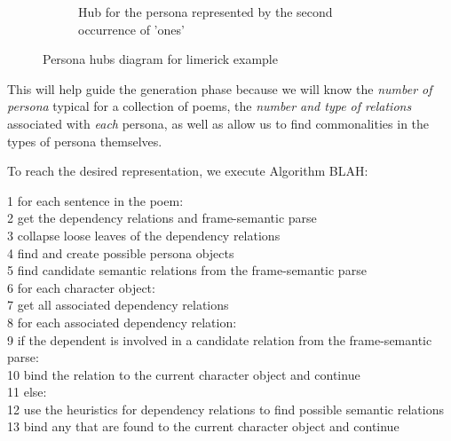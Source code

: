 \begin{figure*}[t!]
\begin{subfigure}[t]{0.45\textwidth}
            \caption{Hub for the persona represented by the second occurrence of 'ones'}
        \end{subfigure}
    \caption{Persona hubs diagram for limerick example}
    \label{fig:limerick-hubs}
\end{figure*}

This will help guide the generation phase because we will know the \textit{number of persona} typical for a collection of poems, the \textit{number and type of relations} associated with \textit{each} persona, as well as allow us to find commonalities in the types of persona themselves.

To reach the desired representation, we execute Algorithm BLAH:

1 for each sentence in the poem:\\
2   get the dependency relations and frame-semantic parse\\
3	collapse loose leaves of the dependency relations\\
4	find and create possible persona objects\\
5	find candidate semantic relations from the frame-semantic parse\\
6	for each character object:\\
7		get all associated dependency relations\\
8		for each associated dependency relation:\\
9			if the dependent is involved in a candidate relation from the frame-semantic parse:\\
10				bind the relation to the current character object and continue\\
11			else:\\
12				use the heuristics for dependency relations to find possible semantic relations\\
13				bind any that are found to the current character object and continue\\
				
